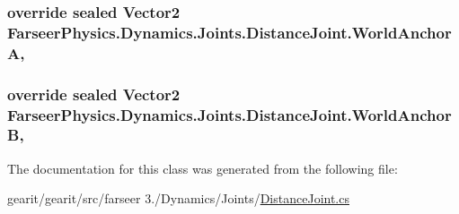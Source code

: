 \hypertarget{class_farseer_physics_1_1_dynamics_1_1_joints_1_1_distance_joint_a73d5dda2d75827c8db82f3bb6afd6a22}{
\subsubsection[{World\+Anchor\+A}]{\setlength{\rightskip}{0pt plus 5cm}override sealed Vector2 Farseer\+Physics.\+Dynamics.\+Joints.\+Distance\+Joint.\+World\+Anchor\+A\hspace{0.3cm}{\ttfamily [get]}, {\ttfamily [set]}}}\label{class_farseer_physics_1_1_dynamics_1_1_joints_1_1_distance_joint_a73d5dda2d75827c8db82f3bb6afd6a22}
\hypertarget{class_farseer_physics_1_1_dynamics_1_1_joints_1_1_distance_joint_a029f97b0fb298ceecd3fa954ce1959cd}{
\subsubsection[{World\+Anchor\+B}]{\setlength{\rightskip}{0pt plus 5cm}override sealed Vector2 Farseer\+Physics.\+Dynamics.\+Joints.\+Distance\+Joint.\+World\+Anchor\+B\hspace{0.3cm}{\ttfamily [get]}, {\ttfamily [set]}}}\label{class_farseer_physics_1_1_dynamics_1_1_joints_1_1_distance_joint_a029f97b0fb298ceecd3fa954ce1959cd}


The documentation for this class was generated from the following file\+:\begin{DoxyCompactItemize}
\item 
gearit/gearit/src/farseer 3./\+Dynamics/\+Joints/\hyperlink{_distance_joint_8cs}{Distance\+Joint.\+cs}\end{DoxyCompactItemize}

